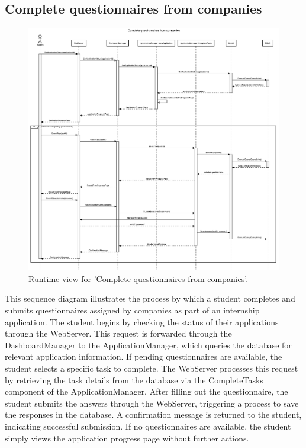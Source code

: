\subsection{Complete questionnaires from companies}
\begin{figure}[H]
    \begin{center}
        \includegraphics[width=0.8\linewidth]{DD/LaTeX/Images/RuntimeView/CompleteQuestionnaires.png}
        \caption{Runtime view for 'Complete questionnaires from companies'.}
        \label{fig:runtime_CompleteQuestionnaires}%
    \end{center}
\end{figure}

This sequence diagram illustrates the process by which a student completes and submits questionnaires assigned by companies as part of an internship application. The student begins by checking the status of their applications through the WebServer. This request is forwarded through the DashboardManager to the ApplicationManager, which queries the database for relevant application information. If pending questionnaires are available, the student selects a specific task to complete. The WebServer processes this request by retrieving the task details from the database via the CompleteTasks component of the ApplicationManager. After filling out the questionnaire, the student submits the answers through the WebServer, triggering a process to save the responses in the database. A confirmation message is returned to the student, indicating successful submission. If no questionnaires are available, the student simply views the application progress page without further actions.

